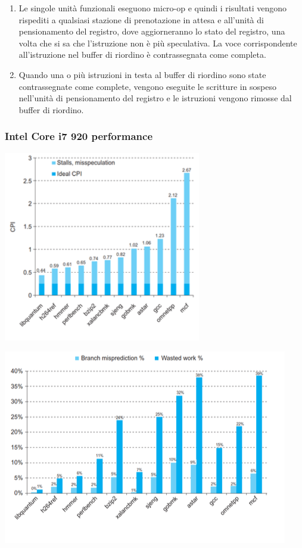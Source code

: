 \documentclass[12pt,a4paper]{article}
\begin{document}
\begin{enumerate}
\item Le singole unità funzionali eseguono micro-op e quindi i risultati vengono rispediti a qualsiasi stazione di prenotazione in attesa e all'unità di pensionamento del registro, dove aggiorneranno lo stato del registro, una volta che si sa che l'istruzione non è più speculativa. La voce corrispondente all'istruzione nel buffer di riordino è contrassegnata come completa.
\item Quando una o più istruzioni in testa al buffer di riordino sono state contrassegnate come complete, vengono eseguite le scritture in sospeso nell'unità di pensionamento del registro e le istruzioni vengono rimosse dal buffer di riordino.
\end{enumerate}
\subsubsection{Intel Core i7 920 performance}
\begin{center}
\includegraphics[width=0.6\columnwidth]{img/intel_performance1.png}
\end{center}
\begin{center}
\includegraphics[width=0.6\columnwidth]{img/intel_performance2.png}
\end{center}
\end{document}
